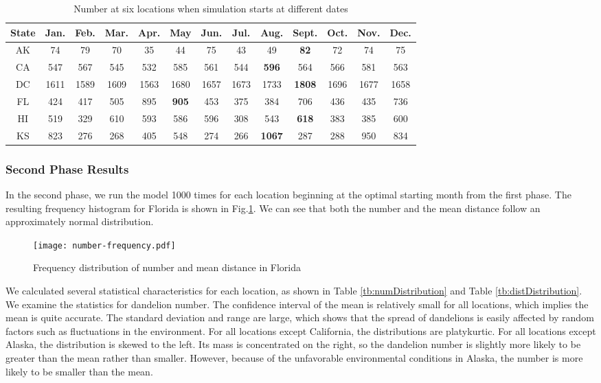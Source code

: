 \documentclass[12pt]{article}
\begin{document}
			{
				\fontsize{10}{14}\selectfont
				{
					\begin{longtable}{ccccccccccccc}
						\caption{Number at six locations when simulation starts at different dates}
						\label{tb:start}\\
						\toprule
						State&Jan.&Feb.&Mar.&Apr.&May&Jun.&Jul.&Aug.&Sept.&Oct.&Nov.&Dec.\\
						\toprule
						AK&74&79&70&35&44&75&43&49&\color{blue}\textbf{82}&72&74&75\\
						CA&547&567&545&532&585&561&544&\color{blue}\textbf{596}&564&566&581&563\\
						DC&1611&1589&1609&1563&1680&1657&1673&1733&\color{blue}\textbf{1808}&1696&1677&1658\\
						FL&424&417&505&895&\color{blue}\textbf{905}&453&375&384&706&436&435&736\\
						HI&519&329&610&593&586&596&308&543&\color{blue}\textbf{618}&383&385&600\\
						KS&823&276&268&405&548&274&266&\color{blue}\textbf{1067}&287&288&950&834\\
						\bottomrule
					\end{longtable}
				}
			}
			
			
			
		\subsubsection{Second Phase Results}
		
			In the second phase, we run the model 1000 times for each location beginning at the optimal starting month from the first phase.  The resulting frequency histogram for Florida is shown in Fig.\ref{fig:freqDand}.  We can see that both the number and the mean distance follow an approximately normal distribution.  
			
			\begin{figure}[htbp]
				\centering
				\texttt{[image: number-frequency.pdf]}
				\caption{Frequency distribution of number and mean distance in Florida}
				\label{fig:freqDand}
			\end{figure}
			
			We calculated several statistical characteristics for each location, as shown in Table \ref{tb:numDistribution} and Table \ref{tb:distDistribution}.	 We examine the statistics for dandelion number.  The confidence interval of the mean is relatively small for all locations, which implies the mean is quite accurate.  The standard deviation and range are large, which shows that the spread of dandelions is easily affected by random factors such as fluctuations in the environment.  For all locations except California, the distributions are platykurtic.  For all locations except Alaska, the distribution is skewed to the left.  Its mass is concentrated on the right, so the dandelion number is slightly more likely to be greater than the mean rather than smaller.  However, because of the unfavorable environmental conditions in Alaska, the number is more likely to be smaller than the mean.
			
\end{document}

